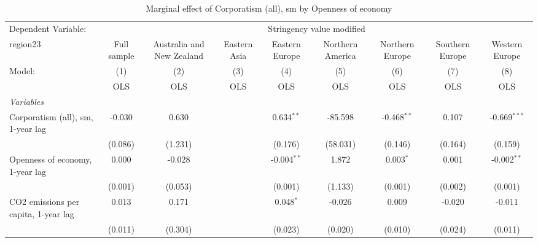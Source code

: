 
\begin{table}[htbp]
   \caption{Marginal effect of Corporatism (all), sm by Openness of economy}
   \centering
   \begin{tabular}{lcccccccc}
      \toprule
      Dependent Variable: & \multicolumn{8}{c}{Stringency value modified}\\
      region23                                                            & Full sample   & Australia and New Zealand & Eastern Asia & Eastern Europe & Northern America & Northern Europe & Southern Europe & Western Europe \\   
      Model:                                                              & (1)           & (2)                       & (3)          & (4)            & (5)              & (6)             & (7)             & (8)\\  
                                                                          &  OLS          & OLS                       & OLS          & OLS            & OLS              & OLS             & OLS             & OLS\\  
      \midrule
      \emph{Variables}\\
      Corporatism (all), sm, 1-year lag                                   & -0.030        & 0.630                     &              & 0.634$^{**}$   & -85.598          & -0.468$^{**}$   & 0.107           & -0.669$^{***}$\\   
                                                                          & (0.086)       & (1.231)                   &              & (0.176)        & (58.031)         & (0.146)         & (0.164)         & (0.159)\\   
      Openness of economy, 1-year lag                                     & 0.000         & -0.028                    &              & -0.004$^{**}$  & 1.872            & 0.003$^{*}$     & 0.001           & -0.002$^{**}$\\   
                                                                          & (0.001)       & (0.053)                   &              & (0.001)        & (1.133)          & (0.001)         & (0.002)         & (0.001)\\   
      CO2 emissions per capita, 1-year lag                                & 0.013         & 0.171                     &              & 0.048$^{*}$    & -0.026           & 0.009           & -0.020          & -0.011\\   
                                                                          & (0.011)       & (0.304)                   &              & (0.023)        & (0.020)          & (0.010)         & (0.024)         & (0.011)\\   

\end{tabular}
\end{table}
